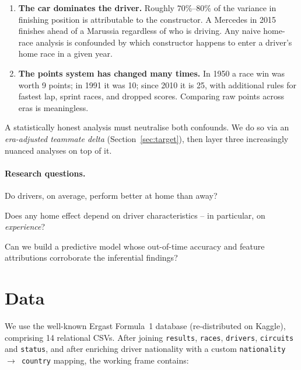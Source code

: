 \documentclass[11pt,a4paper]{article}
\newcommand{\code}[1]{\texttt{\small #1}}
\begin{document}
\begin{enumerate}[leftmargin=*]
    \item \textbf{The car dominates the driver.} Roughly $70\%$--$80\%$ of
    the variance in finishing position is attributable to the constructor.
    A Mercedes in 2015 finishes ahead of a Marussia regardless of who is
    driving. Any naive home-race analysis is confounded by which constructor
    happens to enter a driver's home race in a given year.

    \item \textbf{The points system has changed many times.} In 1950 a race
    win was worth 9 points; in 1991 it was 10; since 2010 it is 25, with
    additional rules for fastest lap, sprint races, and dropped scores.
    Comparing raw points across eras is meaningless.
\end{enumerate}

A statistically honest analysis must neutralise both confounds. We do so via
an \emph{era-adjusted teammate delta} (Section~\ref{sec:target}), then layer
three increasingly nuanced analyses on top of it.

\paragraph{Research questions.}
\begin{description}[leftmargin=*,style=nextline]
    \item[RQ1] Do drivers, on average, perform better at home than away?
    \item[RQ2] Does any home effect depend on driver characteristics --
    in particular, on \emph{experience}?
    \item[RQ3] Can we build a predictive model whose out-of-time accuracy
    and feature attributions corroborate the inferential findings?
\end{description}

\section{Data}\label{sec:data}

We use the well-known Ergast Formula~1 database
(re-distributed on Kaggle), comprising 14 relational CSVs. After joining
\code{results}, \code{races}, \code{drivers}, \code{circuits} and
\code{status}, and after enriching driver nationality with a custom
\code{nationality $\to$ country} mapping, the working frame contains:
\end{document}
